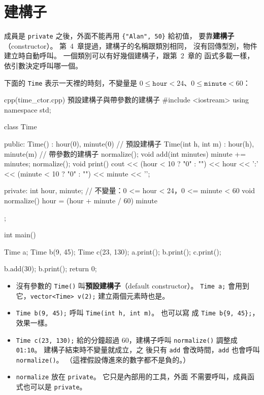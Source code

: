 \section{建構子}
\label{sec:ctor}

成員是 \texttt{private} 之後，外面不能再用 \texttt{\{"Alan", 50\}} 給初值，
要靠\textbf{建構子}（constructor）。 第~4~章提過，建構子的名稱跟類別相同，
沒有回傳型別，物件建立時自動呼叫。 一個類別可以有好幾個建構子，跟第~2~章的
函式多載一樣，依引數決定呼叫哪一個。

下面的 \texttt{Time} 表示一天裡的時刻，不變量是
$0 \le \texttt{hour} < 24$、$0 \le \texttt{minute} < 60$：

\begin{example}[label=ex:time-ctor]{cpp}{(time\_ctor.cpp) 預設建構子與帶參數的建構子}
#include <iostream>
using namespace std;

class Time {
public:
    Time() : hour(0), minute(0) {}            // 預設建構子
    Time(int h, int m) : hour(h), minute(m) {  // 帶參數的建構子
        normalize();
    }
    void add(int minutes) {
        minute += minutes;
        normalize();
    }
    void print() {
        cout << (hour < 10 ? "0" : "") << hour << ':'
             << (minute < 10 ? "0" : "") << minute << '\n';
    }

private:
    int hour, minute;    // 不變量：0 <= hour < 24，0 <= minute < 60
    void normalize() {
        hour = (hour + minute / 60) %
        minute %
    }
};

int main() {
    Time a;
    Time b(9, 45);
    Time c(23, 130);
    a.print();
    b.print();
    c.print();

    b.add(30);
    b.print();
    return 0;
}
\end{example}


\begin{itemize}
\item 沒有參數的 \texttt{Time()} 叫\textbf{預設建構子}（default
constructor）。 \texttt{Time a;} 會用到它，\texttt{vector<Time> v(2);}
建立兩個元素時也是。
\item \texttt{Time b(9, 45);} 呼叫 \texttt{Time(int h, int m)}。 也可以寫
成 \texttt{Time b\{9, 45\};}，效果一樣。
\item \texttt{Time c(23, 130);} 給的分鐘超過 $60$，建構子呼叫
\texttt{normalize()} 調整成 \texttt{01:10}。 建構子結束時不變量就成立，之
後只有 \texttt{add} 會改時間，\texttt{add} 也會呼叫 \texttt{normalize()}。
（這裡假設傳進來的數字都不是負的。）
\item \texttt{normalize} 放在 \texttt{private}。 它只是內部用的工具，外面
不需要呼叫，成員函式也可以是 \texttt{private}。
\end{itemize}


